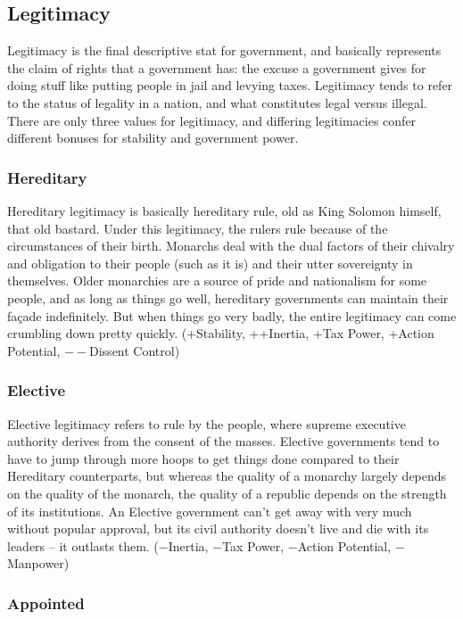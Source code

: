 \documentclass[11 pt]{scrartcl}
\begin{document}
\subsection{Legitimacy}

Legitimacy is the final descriptive stat for government, and basically represents the claim of rights that a government has: the excuse a government gives for doing stuff like putting people in jail and levying taxes. Legitimacy tends to refer to the status of legality in a nation, and what constitutes legal versus illegal. There are only three values for legitimacy, and differing legitimacies confer different bonuses for stability and government power.

\subsubsection*{Hereditary}

Hereditary legitimacy is basically hereditary rule, old as King Solomon himself, that old bastard. Under this legitimacy, the rulers rule because of the circumstances of their birth. Monarchs deal with the dual factors of their chivalry and obligation to their people (such as it is) and their utter sovereignty in themselves. Older monarchies are a source of pride and nationalism for some people, and as long as things go well, hereditary governments can maintain their façade indefinitely. But when things go very badly, the entire legitimacy can come crumbling down pretty quickly. (+Stability, ++Inertia, +Tax Power, +Action Potential, $--$Dissent Control)

\subsubsection*{Elective}

Elective legitimacy refers to rule by the people, where supreme executive authority derives from the consent of the masses. Elective governments tend to have to jump through more hoops to get things done compared to their Hereditary counterparts, but whereas the quality of a monarchy largely depends on the quality of the monarch, the quality of a republic depends on the strength of its institutions. An Elective government can’t get away with very much without popular approval, but its civil authority doesn’t live and die with its leaders – it outlasts them. ($-$Inertia, $-$Tax Power, $-$Action Potential, $-$Manpower)

\subsubsection*{Appointed}
\end{document}
